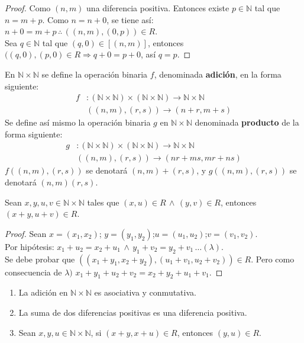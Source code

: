 \begin{proof}
  Como $(n,m)$ una diferencia positiva. Entonces existe $p \in \mathbb{N}$ tal
  que $n = m+ p$. Como $n = n + 0 $, se tiene así: $n+0 = m + p \, \therefore
  \, ((n,m),(0,p))\in R$. \\
  Sea $q \in \mathbb{N}$ tal que $(q,0) \in [(n,m)]$, entonces $((q,0), (p,0)
  \in R \Rightarrow q + 0 = p + 0$, así $q = p$.
\end{proof}
\begin{definition}
  En $\mathbb{N}\times \mathbb{N}$ se define la operación binaria $f$,
  denominada \textbf{adición}, en la forma siguiente:
  \begin{align*}
    f &: (\mathbb{N} \times \mathbb{N})\times (\mathbb{N} \times \mathbb{N})
    \rightarrow \mathbb{N} \times \mathbb{N} \\
    & ((n,m),(r,s)) \rightarrow (n+r,m+s)
  \end{align*}
  Se define así mismo la operación binaria $g$ en $\mathbb{N}\times
  \mathbb{N}$ denominada \textbf{producto} de la forma siguiente: 
  \begin{align*}
    g&:(\mathbb{N} \times \mathbb{N})\times(\mathbb{N} \times \mathbb{N})
    \rightarrow \mathbb{N} \times \mathbb{N} \\
    &((n,m),(r,s)) \rightarrow (nr + ms, mr + ns)
  \end{align*}
  $f((n,m),(r,s))$ se denotará $(n,m) + (r,s)$, y $g((n,m),(r,s))$ se denotará
  $(n,m)(r,s)$.
\end{definition}
\begin{lemma}\label{lemma:4}
  Sean $x,y,u,v \in \mathbb{N} \times \mathbb{N}$ tales que $(x,u)\in R \,
  \land \, (y,v) \in R$, entonces $(x +y, u +v) \in R$.
\end{lemma}
\begin{proof}
  Sean $x = (x_1, x_2)$; $y = (y_1, y_2)$;$u = (u_1, u_2)$;$v = (v_1, v_2)$.\\
  Por hipótesis: $x_1 + u_2 = x_2 + u_1 \, \land \, y_1 + v_2 = y_2 + v_1\,
  \ldots (\lambda)$.\\
  Se debe probar que $((x_1 + y_1 , x_2 + y_2),(u_1 + v_1,
  u_2 + v_2)) \in R$. Pero como consecuencia de $\lambda)$ $x_1 + y_1 + u_2 +
  v_2 = x_2 + y_2 + u_1 +v_1$.
\end{proof}
\begin{lemma}\label{lemma:5}
  \begin{enumerate}
    \item La adición en $\mathbb{N} \times \mathbb{N}$ es asociativa y
      conmutativa.
    \item La suma de dos diferencias positivas es una diferencia
      positiva.
    \item Sean $x,y,u\in \mathbb{N} \times \mathbb{N}$, si $(x +y, x
      +u)\in R$, entonces $(y,u) \in R$. 
  \end{enumerate}
\end{lemma}
